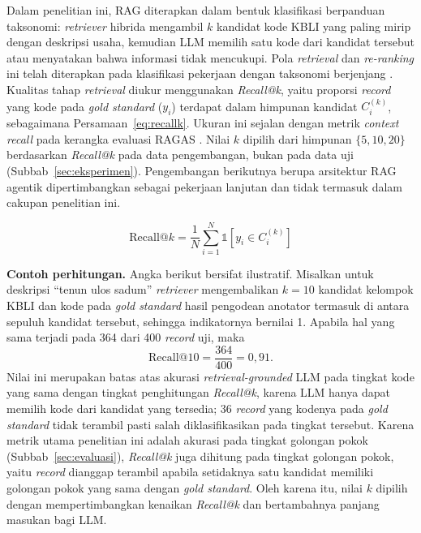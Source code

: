 Dalam penelitian ini, RAG diterapkan dalam bentuk klasifikasi berpanduan taksonomi: \textit{retriever} hibrida mengambil $k$ kandidat kode KBLI yang paling mirip dengan deskripsi usaha, kemudian LLM memilih satu kode dari kandidat tersebut atau menyatakan bahwa informasi tidak mencukupi. Pola \textit{retrieval} dan \textit{re-ranking} ini telah diterapkan pada klasifikasi pekerjaan dengan taksonomi berjenjang \cite{achananuparp2025occupation}. Kualitas tahap \textit{retrieval} diukur menggunakan \textit{Recall@k}, yaitu proporsi \textit{record} yang kode pada \textit{gold standard} ($y_i$) terdapat dalam himpunan kandidat $C_i^{(k)}$, sebagaimana Persamaan~\eqref{eq:recallk}. Ukuran ini sejalan dengan metrik \textit{context recall} pada kerangka evaluasi RAGAS \cite{es2024ragas}. Nilai $k$ dipilih dari himpunan $\{5, 10, 20\}$ berdasarkan \textit{Recall@k} pada data pengembangan, bukan pada data uji (Subbab~\ref{sec:eksperimen}). Pengembangan berikutnya berupa arsitektur RAG agentik \cite{singh2025agentic} dipertimbangkan sebagai pekerjaan lanjutan dan tidak termasuk dalam cakupan penelitian ini.

\begin{equation}
  \text{Recall@}k = \frac{1}{N}\sum_{i=1}^{N} \mathbb{1}\left[y_i \in C_i^{(k)}\right]
  \label{eq:recallk}
\end{equation}

\noindent\textbf{Contoh perhitungan.} Angka berikut bersifat ilustratif. Misalkan untuk deskripsi ``tenun ulos sadum'' \textit{retriever} mengembalikan $k = 10$ kandidat kelompok KBLI dan kode pada \textit{gold standard} hasil pengodean anotator termasuk di antara sepuluh kandidat tersebut, sehingga indikatornya bernilai 1. Apabila hal yang sama terjadi pada 364 dari 400 \textit{record} uji, maka
\[
  \text{Recall@}10 = \frac{364}{400} = 0{,}91.
\]
Nilai ini merupakan batas atas akurasi \textit{retrieval-grounded} LLM pada tingkat kode yang sama dengan tingkat penghitungan \textit{Recall@k}, karena LLM hanya dapat memilih kode dari kandidat yang tersedia; 36 \textit{record} yang kodenya pada \textit{gold standard} tidak terambil pasti salah diklasifikasikan pada tingkat tersebut. Karena metrik utama penelitian ini adalah akurasi pada tingkat golongan pokok (Subbab~\ref{sec:evaluasi}), \textit{Recall@k} juga dihitung pada tingkat golongan pokok, yaitu \textit{record} dianggap terambil apabila setidaknya satu kandidat memiliki golongan pokok yang sama dengan \textit{gold standard}.
Oleh karena itu, nilai $k$ dipilih dengan mempertimbangkan kenaikan \textit{Recall@k} dan bertambahnya panjang masukan bagi LLM.

